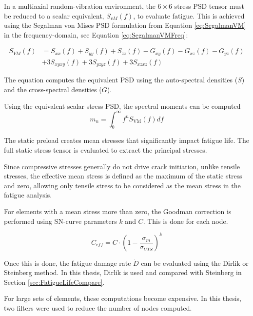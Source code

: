 \documentclass[a4paper,twoside]{bth}
\begin{document}
In a multiaxial random-vibration environment, the $6\times6$ stress \ac{PSD} tensor must be reduced to a scalar equivalent, $S_{vM}(f)$, to evaluate fatigue. This is achieved using the Segalman von Mises \ac{PSD} formulation from Equation \ref{eq:SegalmanVM} in the frequency-domain, see Equation \ref{eq:SegalmanVMFreq}:

\begin{equation}\label{eq:SegalmanVMFreq}
\begin{aligned}
    S_{VM}(f) &= S_{xx}(f) + S_{yy}(f) + S_{zz}(f) - G_{xy}(f) - G_{xz}(f) - G_{yz}(f) \\& + 3S_{xyxy}(f) + 3S_{yzyz}(f) + 3S_{xzxz}(f)
\end{aligned}
\end{equation}

The equation computes the equivalent \ac{PSD} using the auto-spectral densities ($S$) and the cross-spectral densities ($G$).

Using the equivalent scalar stress \ac{PSD}, the spectral moments can be computed
\begin{equation}
    m_n = \int_0^\infty f^n S_{\mathrm{VM}}(f) df
\end{equation}

The static preload creates mean stresses that significantly impact fatigue life. The full static stress tensor is evaluated to extract the principal stresses.

Since compressive stresses generally do not drive crack initiation, unlike tensile stresses, the effective mean stress is defined as the maximum of the static stress and zero, allowing only tensile stress to be considered as the mean stress in the fatigue analysis.

For elements with a mean stress more than zero, the Goodman correction is performed using SN-curve parameters $k$ and $C$. This is done for each node.

\begin{equation} \label{eq:C_eff_Goodman}
    C_{eff} = C\cdot\left( 1- \frac{\sigma_m}{\sigma_{UTS}} \right)^k
\end{equation}

Once this is done, the fatigue damage rate $\dot{D}$ can be evaluated using the Dirlik or Steinberg method. In this thesis, Dirlik is used and compared with Steinberg in Section \ref{sec:FatigueLifeCompare}.

For large sets of elements, these computations become expensive. In this thesis, two filters were used to reduce the number of nodes computed.
\end{document}
